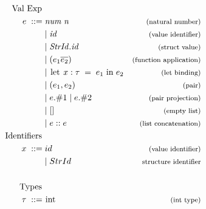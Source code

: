 \begin{figure}[htb]
\begin{align*}
\begin{aligned}
\text{Val Exp } \\
e \; ::= \; &\mathit{num \; n \;}     &\expl{(natural number)} \\
&|\;\mathit{id}                       &\expl{(value identifier)}\\
&|\;\mathit{StrId.id}                 &\expl{(struct value)}\\
&|\;(e_{1} \overline{e_{2}})                        & \expl{(function application)}\\
&|\;\text{\lsttext{let}}\; x : \tau \; =\; e_{1}\; \text{\lsttext{in}} \; e_{2}
                                      &\expl{(let binding)}\\
&|\;(e_{1}, e_{2})                    &\expl{(pair)}\\
&|\;e.\#1 \;| \;e.\#2                 &\expl{(pair projection)}\\
&|\;[]                                &\expl{(empty list)}\\
&|\;e::e                              &\expl{(list concatenation)}
\\
\text{Identifiers } \\
x \; ::= \; &id                      & \expl{(value identifier)}\\ 
&|\;StrId                            & \expl{structure identifier}\\
\\
\text{Types }\\
\tau \; ::= \; &\text{\lsttext{int}}  &\expl{(int type)}\\

\end{aligned}
\end{align*}
\end{figure}
